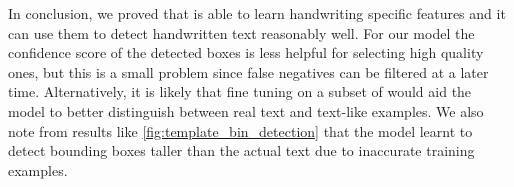 
In conclusion, we proved that \FRCNN{} is able to learn handwriting specific features and it can use them to detect handwritten text reasonably well. For our model the confidence score of the detected boxes is less helpful for selecting high quality ones, but this is a small problem since false negatives can be filtered at a later time. Alternatively, it is likely that fine tuning on a subset of  would aid the model to better distinguish between real text and text-like examples. We also note from results like \autoref{fig:template_bin_detection} that the model learnt to detect bounding boxes taller than the actual text due to inaccurate training examples.
